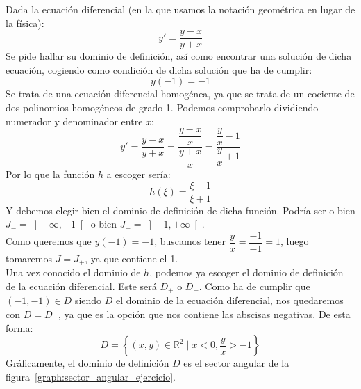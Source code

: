 \begin{ejemplo}
    Dada la ecuación diferencial (en la que usamos la notación geométrica en lugar de la física):
    \begin{equation*}
        y' = \dfrac{y-x}{y+x}
    \end{equation*}
    Se pide hallar su dominio de definición, así como encontrar una solución de dicha ecuación, cogiendo como condición de dicha solución que ha de cumplir: 
    \begin{equation*}
        y(-1) = -1
    \end{equation*}
    Se trata de una ecuación diferencial homogénea, ya que se trata de un cociente de dos polinomios homogéneos de grado 1. Podemos comprobarlo dividiendo numerador y denominador entre $x$:
    \begin{equation*}
        y' = \dfrac{y-x}{y+x} = \dfrac{\dfrac{y-x}{x}}{\dfrac{y+x}{x}} = \dfrac{\dfrac{y}{x}-1}{\dfrac{y}{x}+1}
    \end{equation*}
    Por lo que la función $h$ a escoger sería:
    \begin{equation*}
        h(\xi) = \dfrac{\xi - 1}{\xi + 1}
    \end{equation*}
    Y debemos elegir bien el dominio de definición de dicha función. Podría ser o bien $J_- = \left]-\infty, -1\right[$ o bien $J_+ = \left]-1, +\infty\right[$.\\
    Como queremos que $y(-1) = -1$, buscamos tener $\dfrac{y}{x} = \dfrac{-1}{-1}=  1$, luego tomaremos $J = J_+$, ya que contiene el 1.\\

    Una vez conocido el dominio de $h$, podemos ya escoger el dominio de definición de la ecuación diferencial. Este será $D_+$ o $D_-$. Como ha de cumplir que $(-1,-1)\in D$ siendo $D$ el dominio de la ecuación diferencial, nos quedaremos con $D = D_-$, ya que es la opción que nos contiene las abscisas negativas. De esta forma:
    \begin{equation*}
        D = \left\{(x,y)\in \mathbb{R}^2 \mid x<0, \dfrac{y}{x}>-1\right\}
    \end{equation*}
    Gráficamente, el dominio de definición $D$ es el sector angular de la figura~\ref{graph:sector_angular_ejercicio}.

\begin{figure}[H]
\centering
{}
\end{figure}
\end{ejemplo}
